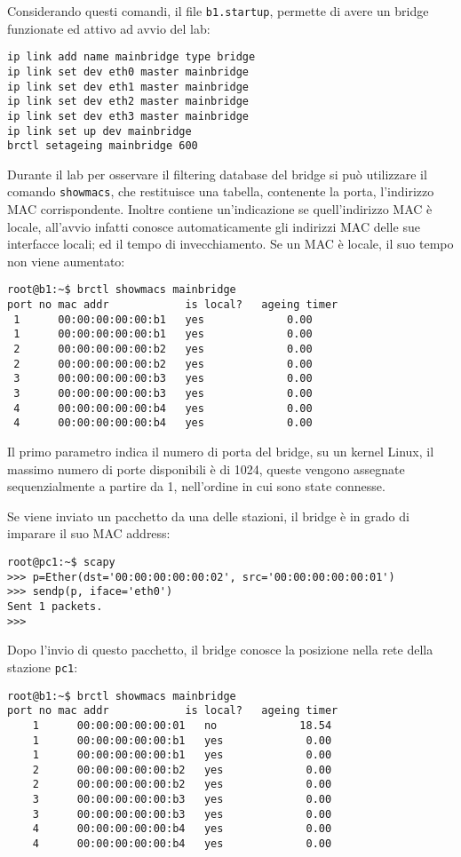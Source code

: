 \documentclass{article}
\numberwithin{equation}{subsection}
\begin{document}
Considerando questi comandi, il file \verb|b1.startup|, permette di avere un bridge funzionate ed attivo ad avvio del lab:
\begin{verbatim}
ip link add name mainbridge type bridge
ip link set dev eth0 master mainbridge
ip link set dev eth1 master mainbridge
ip link set dev eth2 master mainbridge
ip link set dev eth3 master mainbridge
ip link set up dev mainbridge
brctl setageing mainbridge 600
\end{verbatim}

Durante il lab per osservare il filtering database del bridge si può utilizzare il comando \verb|showmacs|, che restituisce una tabella, contenente la porta, 
l'indirizzo MAC corrispondente. Inoltre contiene un'indicazione se quell'indirizzo MAC è locale, all'avvio infatti conosce automaticamente gli indirizzi MAC delle sue 
interfacce locali; 
ed il tempo di invecchiamento. Se un MAC è locale, il suo tempo non viene aumentato:
\begin{verbatim}
root@b1:~$ brctl showmacs mainbridge
port no mac addr            is local?   ageing timer
 1      00:00:00:00:00:b1   yes             0.00
 1      00:00:00:00:00:b1   yes             0.00
 2      00:00:00:00:00:b2   yes             0.00
 2      00:00:00:00:00:b2   yes             0.00
 3      00:00:00:00:00:b3   yes             0.00
 3      00:00:00:00:00:b3   yes             0.00
 4      00:00:00:00:00:b4   yes             0.00
 4      00:00:00:00:00:b4   yes             0.00
\end{verbatim}
Il primo parametro indica il numero di porta del bridge, su un kernel Linux, il massimo numero di porte disponibili è di 1024, queste vengono assegnate sequenzialmente 
a partire da 1, nell'ordine in cui sono state connesse. 

Se viene inviato un pacchetto da una delle stazioni, il bridge è in grado di imparare il suo MAC address:
\begin{verbatim}
root@pc1:~$ scapy
>>> p=Ether(dst='00:00:00:00:00:02', src='00:00:00:00:00:01')
>>> sendp(p, iface='eth0')
Sent 1 packets.
>>>
\end{verbatim}

Dopo l'invio di questo pacchetto, il bridge conosce la posizione nella rete della stazione \verb|pc1|:
\begin{verbatim}
root@b1:~$ brctl showmacs mainbridge
port no mac addr            is local?   ageing timer
    1      00:00:00:00:00:01   no             18.54
    1      00:00:00:00:00:b1   yes             0.00
    1      00:00:00:00:00:b1   yes             0.00
    2      00:00:00:00:00:b2   yes             0.00
    2      00:00:00:00:00:b2   yes             0.00
    3      00:00:00:00:00:b3   yes             0.00
    3      00:00:00:00:00:b3   yes             0.00
    4      00:00:00:00:00:b4   yes             0.00
    4      00:00:00:00:00:b4   yes             0.00
\end{verbatim}
\end{document}
